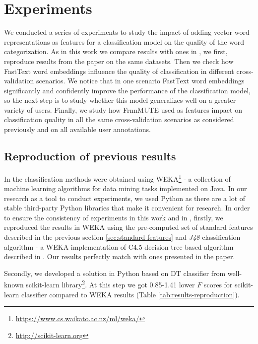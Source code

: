 \chapter{Experiments}
\label{ch:experiments}

We conducted a series of experiments to study the impact of adding vector word representations as features for a classification model on the quality of the word categorization. As in this work we compare results with ones in \cite{Grabar-PITR2014}, we first, reproduce results from the paper on the same datasets. Then we check how FastText word embeddings influence the quality of classification in different cross-validation scenarios. We notice that in one scenario FastText word embeddings significantly and confidently improve the performance of the classification model, so the next step is to study whether this model generalizes well on a greater variety of users. Finally, we study how FrnnMUTE used as features impact on classification quality in all the same cross-validation scenarios as considered previously and on all available user annotations.

\section{Reproduction of previous results}

In \cite{Grabar-PITR2014} the classification methods were obtained using WEKA\footnote{\url{https://www.cs.waikato.ac.nz/ml/weka/}} - a collection of machine learning algorithms for data mining tasks implemented on Java. In our research as a tool to conduct experiments, we used Python as there are a lot of stable third-party Python libraries that make it convenient for research. In order to ensure the consistency of experiments in this work and in \cite{Grabar-PITR2014}, firstly, we reproduced the results in WEKA using the pre-computed set of standard features described in the previous section \ref{sec:standard-features} and \textit{J48} classification algorithm - a WEKA implementation of C4.5 decision tree based algorithm described in \cite{Quinlan1993}. Our results perfectly match with ones presented in the paper. 

Secondly, we developed a solution in Python based on DT classifier from well-known scikit-learn library\footnote{\url{http://scikit-learn.org}}. At this step we got 0.85-1.41 lower $F$ scores for scikit-learn classifier compared to WEKA results (Table \ref{tab:results-reproduction}).

